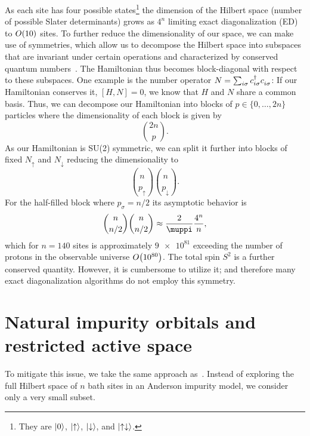 As each site has four possible states\footnote{
    They are $\lvert0\rangle$, $\lvert\uparrow\rangle$, $\lvert\downarrow\rangle$, and $\lvert\uparrow\downarrow\rangle$.
}
the dimension of the Hilbert space (number of possible Slater determinants)
grows as $4^n$ limiting exact diagonalization (ED)
to $O\!\left(10\right)$ sites.
To further reduce the dimensionality of our space,
we can make use of symmetries,
which allow us to decompose the Hilbert space into subspaces that are invariant under certain
operations and characterized by conserved quantum numbers~\cite{Wallerberger2022}.
The Hamiltonian thus becomes block-diagonal with respect to these subspaces.
One example is the number operator $N = \sum_{i\sigma} c^\dag_{i\sigma} c^{\pdag}_{i\sigma}$:
If our Hamiltonian conserves it, $[H, N] = 0$,
we know that $H$ and $N$ share a common basis.
Thus, we can decompose our Hamiltonian into blocks of $p\in\{0, \ldots, 2n\}$ particles
where the dimensionality of each block is given by
\begin{equation}
    \binom{2n}{p}.
\end{equation}
As our Hamiltonian is SU(2) symmetric, %
we can split it further into blocks of fixed $N_\uparrow$ and $N_\downarrow$
reducing the dimensionality to
\begin{equation}
    \binom{n}{p_\uparrow} \binom{n}{p_\downarrow}.
\end{equation}
For the half-filled block where $p_\sigma = n/2$ its asymptotic behavior is
\begin{equation}
    \binom{n}{n/2} \binom{n}{n/2}
    \approx
    \frac{2}{\muppi}\frac{4^n}{n},
\end{equation}
which for $n=140$ sites is approximately $\num{9e81}$
exceeding the number of protons in the observable universe $O\!\left(\num{e80}\right)$. %
The total spin $S^2$ is a further conserved quantity.
However, it is cumbersome to utilize it;
and therefore many exact diagonalization algorithms do not employ this symmetry.

\section{Natural impurity orbitals and restricted active space}%

To mitigate this issue,
we take the same approach as~\cite{Lu2019}.
Instead of exploring the full Hilbert space of $n$ bath sites in an Anderson impurity model,
we consider only a very small subset.

